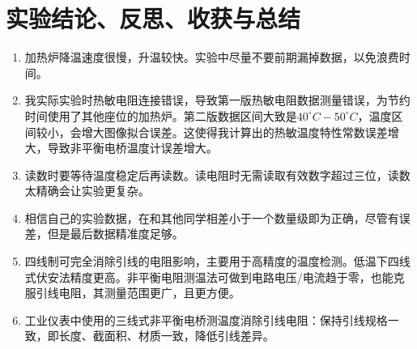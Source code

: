 \documentclass[11pt]{article}
\begin{document}
\section{实验结论、反思、收获与总结}
    \begin{enumerate}
        \item 加热炉降温速度很慢，升温较快。实验中尽量不要前期漏掉数据，以免浪费时间。
        \item 我实际实验时热敏电阻连接错误，导致第一版热敏电阻数据测量错误，为节约时间使用了其他座位的加热炉。第二版数据区间大致是$40^{\circ}C-50^{\circ}C$，温度区间较小，会增大图像拟合误差。这使得我计算出的热敏温度特性常数误差增大，导致非平衡电桥温度计误差增大。
        \item 读数时要等待温度稳定后再读数。读电阻时无需读取有效数字超过三位，读数太精确会让实验更复杂。
        \item 相信自己的实验数据，在和其他同学相差小于一个数量级即为正确，尽管有误差，但是最后数据精准度足够。
        \item 四线制可完全消除引线的电阻影响，主要用于高精度的温度检测。低温下四线式伏安法精度更高。非平衡电阻测温法可做到电路电压/电流趋于零，也能克服引线电阻，其测量范围更广，且更方便。
        \item 工业仪表中使用的三线式非平衡电桥测温度消除引线电阻：保持引线规格一致，即长度、截面积、材质一致，降低引线差异。
    \end{enumerate}
    
\end{document}
